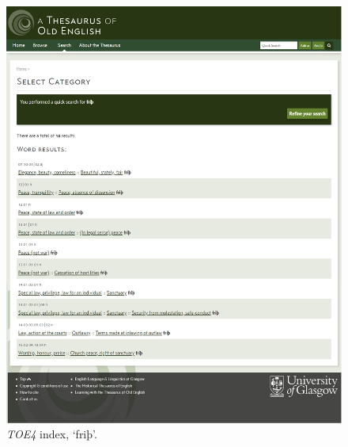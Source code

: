 \begin{figure}[htbp]
  \centering
    \includegraphics[width=\linewidth]{Stolk_thes-content/fig/thes/TOE4-index-frith.png}
  \caption{\textit{TOE4} index, `friþ'.}
  \label{fig:1.A:TOE4:index}
\end{figure}



